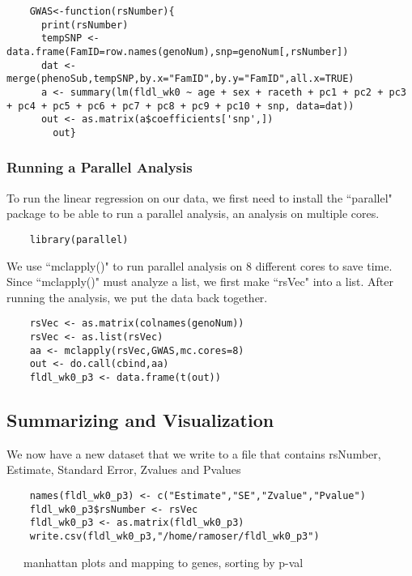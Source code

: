 \documentclass{ar2e}
\begin{document}
\begin{samepage}
\begin{verbatim}
    GWAS<-function(rsNumber){
      print(rsNumber)
      tempSNP <- data.frame(FamID=row.names(genoNum),snp=genoNum[,rsNumber])
      dat <- merge(phenoSub,tempSNP,by.x="FamID",by.y="FamID",all.x=TRUE)
      a <- summary(lm(fldl_wk0 ~ age + sex + raceth + pc1 + pc2 + pc3 + pc4 + pc5 + pc6 + pc7 + pc8 + pc9 + pc10 + snp, data=dat))
      out <- as.matrix(a$coefficients['snp',])
        out}
\end{verbatim}
\end{samepage}
%
\subsubsection{Running a Parallel Analysis}

To run the linear regression on our data, we first need to install the ``parallel" package to be able to run a parallel analysis, an analysis on multiple cores.

\begin{verbatim}
    library(parallel)
\end{verbatim}

We use ``mclapply()" to run parallel analysis on 8 different cores to save time. Since ``mclapply()" must analyze a list, we first make ``rsVec" into a list. After running the analysis, we put the data back together.

\begin{samepage}
\begin{verbatim}
    rsVec <- as.matrix(colnames(genoNum))
    rsVec <- as.list(rsVec)
    aa <- mclapply(rsVec,GWAS,mc.cores=8)
    out <- do.call(cbind,aa)
    fldl_wk0_p3 <- data.frame(t(out))
\end{verbatim}
\end{samepage}

\subsection{Summarizing and Visualization}

We now have a new dataset that we write to a file that contains rsNumber, Estimate, Standard Error, Zvalues and Pvalues

\begin{samepage}
\begin{verbatim}
    names(fldl_wk0_p3) <- c("Estimate","SE","Zvalue","Pvalue")
    fldl_wk0_p3$rsNumber <- rsVec
    fldl_wk0_p3 <- as.matrix(fldl_wk0_p3)
    write.csv(fldl_wk0_p3,"/home/ramoser/fldl_wk0_p3")
\end{verbatim}
\end{samepage}
~~~manhattan plots and mapping to genes, sorting by p-val
\end{document}
